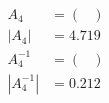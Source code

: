 
\begin{align}
A_4 & = 
\begin{pmatrix}

\end{pmatrix} \\
|A_4| & = 4.719 \\
A_4^{-1} & = 
\begin{pmatrix}

\end{pmatrix} \\
|A_4^{-1}| & = 0.212
\end{align}
